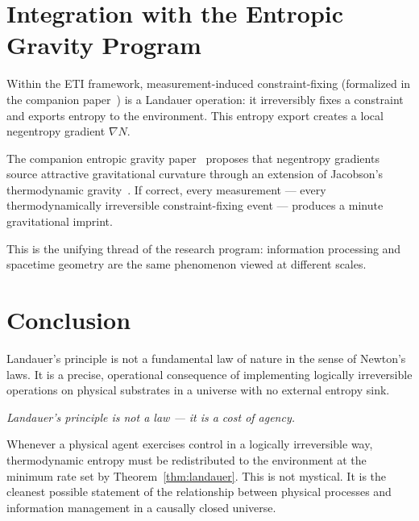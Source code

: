 \documentclass[12pt,letterpaper]{article}
\theoremstyle{plain}
\theoremstyle{definition}
\theoremstyle{remark}
\begin{document}
\section{Integration with the Entropic Gravity Program}
\label{sec:gravity}

Within the ETI framework, measurement-induced constraint-fixing (formalized in the companion
paper~\cite{MonetteB2026}) is a Landauer operation: it irreversibly fixes a constraint and
exports entropy to the environment.  This entropy export creates a local negentropy gradient
$\nabla N$.

The companion entropic gravity paper~\cite{MonetteA2026} proposes that negentropy gradients
source attractive gravitational curvature through an extension of Jacobson's thermodynamic
gravity~\cite{Jacobson1995}.  If correct, every measurement --- every thermodynamically
irreversible constraint-fixing event --- produces a minute gravitational imprint.

This is the unifying thread of the research program: information processing and spacetime
geometry are the same phenomenon viewed at different scales.

\section{Conclusion}
\label{sec:conclusion}

Landauer's principle is not a fundamental law of nature in the sense of Newton's laws.  It is
a precise, operational consequence of implementing logically irreversible operations on physical
substrates in a universe with no external entropy sink.

\medskip

\begin{center}
\textit{Landauer's principle is not a law --- it is a cost of agency.}
\end{center}

\medskip

Whenever a physical agent exercises control in a logically irreversible way, thermodynamic
entropy must be redistributed to the environment at the minimum rate set by
Theorem~\ref{thm:landauer}.  This is not mystical.  It is the cleanest possible statement of
the relationship between physical processes and information management in a causally closed
universe.
\end{document}
